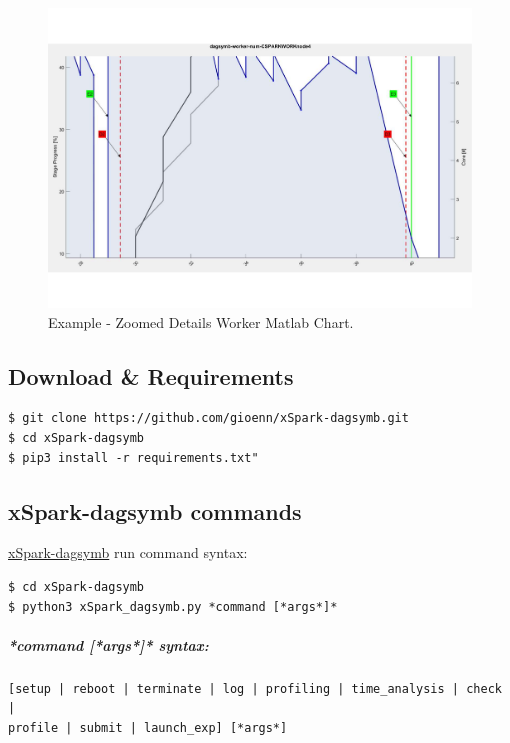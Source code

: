 \begin{figure}[thbp]
	\centering
	\includegraphics[width=\columnwidth]{images/plot_worker_zoom.pdf}
	\caption{Example - Zoomed Details Worker Matlab Chart.}
	\label{fig:plot_worker_zoom}
\end{figure}
 
\hypertarget{download-requirements}{%
\subsection{Download \& Requirements}\label{download-requirements}}

\begin{verbatim}
$ git clone https://github.com/gioenn/xSpark-dagsymb.git
$ cd xSpark-dagsymb
$ pip3 install -r requirements.txt"
\end{verbatim}

\hypertarget{xspark-dagsymb-commands}{%
\subsection{xSpark-dagsymb commands}\label{xspark-dagsymb-commands}}

\href{https://github.com/gioenn/xSpark-dagsymb}{xSpark-dagsymb} run
command syntax:

\begin{verbatim}
$ cd xSpark-dagsymb
$ python3 xSpark_dagsymb.py *command [*args*]*
\end{verbatim}

\hypertarget{command-args-syntax}{%
\subparagraph{*command {[}*args*{]}*
	syntax:}\label{command-args-syntax}}

\begin{verbatim}
[setup | reboot | terminate | log | profiling | time_analysis | check | 
profile | submit | launch_exp] [*args*]
\end{verbatim}

